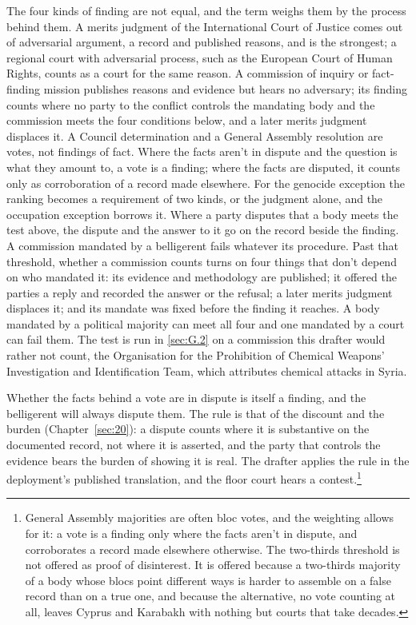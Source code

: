 The four kinds of finding are not equal, and the term weighs them by the process behind them. A merits judgment of the International Court of Justice comes out of adversarial argument, a record and published reasons, and is the strongest; a regional court with adversarial process, such as the European Court of Human Rights, counts as a court for the same reason. A commission of inquiry or fact-finding mission publishes reasons and evidence but hears no adversary; its finding counts where no party to the conflict controls the mandating body and the commission meets the four conditions below, and a later merits judgment displaces it. A Council determination and a General Assembly resolution are votes, not findings of fact. Where the facts aren't in dispute and the question is what they amount to, a vote is a finding; where the facts are disputed, it counts only as corroboration of a record made elsewhere. For the genocide exception the ranking becomes a requirement of two kinds, or the judgment alone, and the occupation exception borrows it. Where a party disputes that a body meets the test above, the dispute and the answer to it go on the record beside the finding. A commission mandated by a belligerent fails whatever its procedure. Past that threshold, whether a commission counts turns on four things that don't depend on who mandated it: its evidence and methodology are published; it offered the parties a reply and recorded the answer or the refusal; a later merits judgment displaces it; and its mandate was fixed before the finding it reaches. A body mandated by a political majority can meet all four and one mandated by a court can fail them. The test is run in \ref{sec:G.2} on a commission this drafter would rather not count, the Organisation for the Prohibition of Chemical Weapons' Investigation and Identification Team, which attributes chemical attacks in Syria.

Whether the facts behind a vote are in dispute is itself a finding, and the belligerent will always dispute them. The rule is that of the discount and the burden (Chapter~\ref{sec:20}): a dispute counts where it is substantive on the documented record, not where it is asserted, and the party that controls the evidence bears the burden of showing it is real. The drafter applies the rule in the deployment's published translation, and the floor court hears a contest.\footnote{General Assembly majorities are often bloc votes, and the weighting allows for it: a vote is a finding only where the facts aren't in dispute, and corroborates a record made elsewhere otherwise. The two-thirds threshold is not offered as proof of disinterest. It is offered because a two-thirds majority of a body whose blocs point different ways is harder to assemble on a false record than on a true one, and because the alternative, no vote counting at all, leaves Cyprus and Karabakh with nothing but courts that take decades.}
